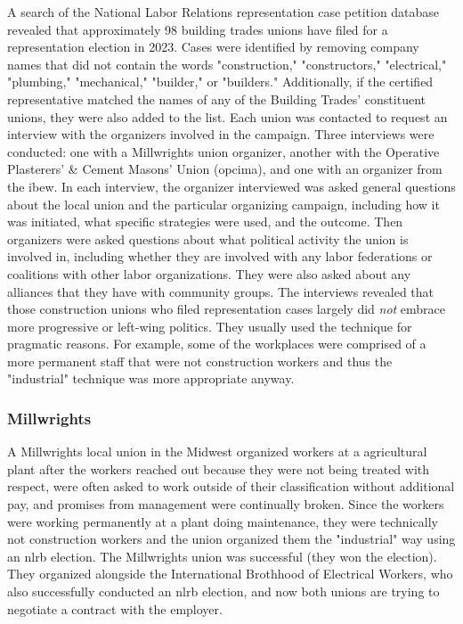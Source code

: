 \documentclass[12pt]{article}
\begin{document}
A search of the National Labor Relations representation case petition database revealed that approximately 98 building trades unions have filed for a representation election in 2023. Cases were identified by removing company names that did not contain the words "construction," "constructors," "electrical," "plumbing," "mechanical," "builder," or "builders." Additionally, if the certified representative matched the names of any of the Building Trades’ constituent unions, they were also added to the list. Each union was contacted to request an interview with the organizers involved in the campaign. Three interviews were conducted: one with a Millwrights union organizer, another with the Operative Plasterers' \& Cement Masons' Union (\acrshort{opcima}), and one with an organizer from the \acrfull{ibew}. In each interview, the organizer interviewed was asked general questions about the local union and the particular organizing campaign, including how it was initiated, what specific strategies were used, and the outcome. Then organizers were asked questions about what political activity the union is involved in, including whether they are involved with any labor federations or coalitions with other labor organizations. They were also asked about any alliances that they have with community groups. The interviews revealed that those construction unions who filed representation cases largely did \emph{not} embrace more progressive or left-wing politics. They usually used the technique for pragmatic reasons. For example, some of the workplaces were comprised of a more permanent staff that were not construction workers and thus the "industrial" technique was more appropriate anyway.

\subsubsection{Millwrights}

A Millwrights local union in the Midwest organized workers at a agricultural plant after the workers reached out because they were not being treated with respect, were often asked to work outside of their classification without additional pay, and promises from management were continually broken. Since the workers were working permanently at a plant doing maintenance, they were technically not construction workers and the union organized them the "industrial" way using an \acrshort{nlrb} election. The Millwrights union was successful (they won the election). They organized alongside the International Brothhood of Electrical Workers, who also successfully conducted an \acrshort{nlrb} election, and now both unions are trying to negotiate a contract with the employer.
\end{document}
